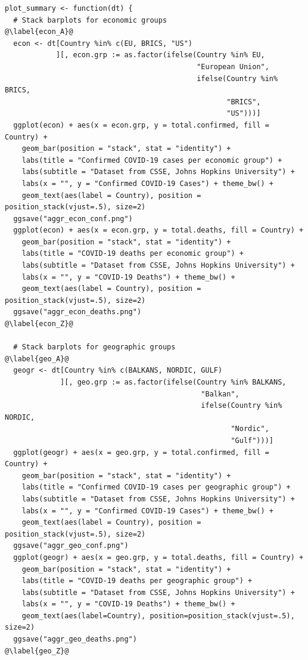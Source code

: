 \begin{verbatim}
plot_summary <- function(dt) {
  # Stack barplots for economic groups                               @\label{econ_A}@
  econ <- dt[Country %in% c(EU, BRICS, "US")
            ][, econ.grp := as.factor(ifelse(Country %in% EU,
                                             "European Union",
                                             ifelse(Country %in% BRICS,
                                                    "BRICS",
                                                    "US")))]
  ggplot(econ) + aes(x = econ.grp, y = total.confirmed, fill = Country) +
    geom_bar(position = "stack", stat = "identity") +
    labs(title = "Confirmed COVID-19 cases per economic group") +
    labs(subtitle = "Dataset from CSSE, Johns Hopkins University") +
    labs(x = "", y = "Confirmed COVID-19 Cases") + theme_bw() +
    geom_text(aes(label = Country), position = position_stack(vjust=.5), size=2)
  ggsave("aggr_econ_conf.png")
  ggplot(econ) + aes(x = econ.grp, y = total.deaths, fill = Country) +
    geom_bar(position = "stack", stat = "identity") +
    labs(title = "COVID-19 deaths per economic group") +
    labs(subtitle = "Dataset from CSSE, Johns Hopkins University") +
    labs(x = "", y = "COVID-19 Deaths") + theme_bw() +
    geom_text(aes(label = Country), position = position_stack(vjust=.5), size=2)
  ggsave("aggr_econ_deaths.png")                                     @\label{econ_Z}@
  
  # Stack barplots for geographic groups                             @\label{geo_A}@
  geogr <- dt[Country %in% c(BALKANS, NORDIC, GULF)
             ][, geo.grp := as.factor(ifelse(Country %in% BALKANS,
                                              "Balkan",
                                              ifelse(Country %in% NORDIC,
                                                     "Nordic",
                                                     "Gulf")))]
  ggplot(geogr) + aes(x = geo.grp, y = total.confirmed, fill = Country) +
    geom_bar(position = "stack", stat = "identity") +
    labs(title = "Confirmed COVID-19 cases per geographic group") +
    labs(subtitle = "Dataset from CSSE, Johns Hopkins University") +
    labs(x = "", y = "Confirmed COVID-19 Cases") + theme_bw() +
    geom_text(aes(label = Country), position = position_stack(vjust=.5), size=2)
  ggsave("aggr_geo_conf.png")
  ggplot(geogr) + aes(x = geo.grp, y = total.deaths, fill = Country) +
    geom_bar(position = "stack", stat = "identity") +
    labs(title = "COVID-19 deaths per geographic group") +
    labs(subtitle = "Dataset from CSSE, Johns Hopkins University") +
    labs(x = "", y = "COVID-19 Deaths") + theme_bw() +
    geom_text(aes(label=Country), position=position_stack(vjust=.5), size=2)
  ggsave("aggr_geo_deaths.png")                                      @\label{geo_Z}@
  

\end{verbatim}
